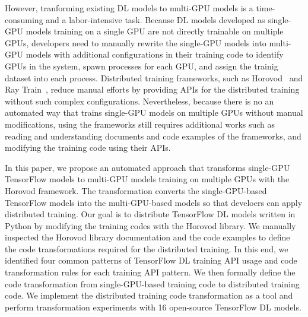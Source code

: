 However, tranforming existing DL models to multi-GPU models is a time-consuming
and a labor-intensive task.
Because DL models developed as single-GPU models training on a single GPU are
not directly trainable on multiple GPUs, developers need to manually rewrite
the single-GPU models into multi-GPU models with additional configurations in
their training code to identify GPUs in the system, spawn processes for each
GPU, and assign the trainig dataset into each process.
Distributed training frameworks, such as Horovod~\cite{sergeev2018horovod} and
Ray Train~\cite{raytrain}, reduce manual efforts by providing APIs for the
distributed training without such complex configurations.
Nevertheless, because there is no an automated way that trains single-GPU
models on multiple GPUs without manual modifications, using the frameworks
still requires additional works such as reading and understanding documents and
code examples of the frameworks, and modifying the training code using their
APIs.




In this paper, we propose an automated approach that transforms single-GPU
TensorFlow models to multi-GPU models training on multiple GPUs with the
Horovod framework.
The transformation converts the single-GPU-based TensorFlow models into the
multi-GPU-based models so that develoers can apply distributed training.
Our goal is to distribute TensorFlow DL models written in Python by modifying
the training codes with the Horovod library.
We manually inspected the Horovod library documentation and the code examples
to define the code transformations required for the distributed training. In
this end, we identified four common patterns of TensorFlow DL training API
usage and code transformation rules for each training API pattern. 
We then formally define the code transformation from single-GPU-based training
code to distributed training code.
We implement the distributed training code transformation as a tool and perform
transformation experiments with 16 open-source TensorFlow DL models. 

